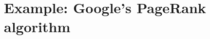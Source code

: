 \documentclass[11pt,nocut]{article}
\begin{document}
\section{Example: Google's PageRank algorithm}


\vspace{1cm}
\centerline{}

%
%
\end{document}
